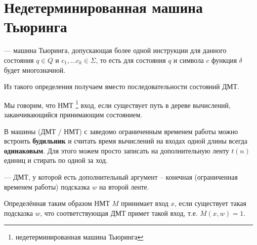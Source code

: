 \section{Недетерминированная машина Тьюринга}
\begin{defn} 
	 --- машина Тьюринга, допускающая более одной инструкции для данного состояния $ q \in Q$ и $ c_1, \ldots c_k \in \Sigma $, то есть для состояния  $ q $ и символа $ c$ функция  $ \delta $ будет многозначной.
\end{defn}

Из такого определения получаем  вместо последовательности состояний ДМТ.

Мы говорим, что НМТ \footnote{недетерминированная машина Тьюринга}  вход, если существует путь в дереве вычислений, \\ заканчивающийся принимающим состоянием.

\begin{st}
	В машины (ДМТ / НМТ) с заведомо ограниченным временем работы можно встроить \textbf{будильник} и считать время вычислений на входах одной длины всегда \textbf{одинаковым}.
	Для этого можем просто записать на дополнительную ленту $ t(n)$ единиц и стирать по одной за ход. 
\end{st}

\begin{defn}
	 --- ДМТ, у которой есть дополнительный аргумент -- конечная (ограниченная временем работы) подсказка $ w$ на второй ленте.
\end{defn}


Определённая таким образом НМТ $ M $ принимает вход $ x $, если существует такая подсказка $ w $, что соответствующая ДМТ примет такой вход, т.е. $ M(x, w) = 1 $.

